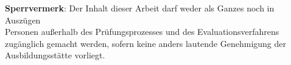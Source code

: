 \cleardoublepage
\begin{center}
\small
\textbf{Sperrvermerk}:
Der Inhalt dieser Arbeit darf weder als Ganzes noch in Auszügen \\
Personen außerhalb des Prüfungsprozesses und des Evaluationsverfahrens zugänglich gemacht werden, sofern keine anders lautende Genehmigung der Ausbildungsstätte vorliegt. 
\end{center}



